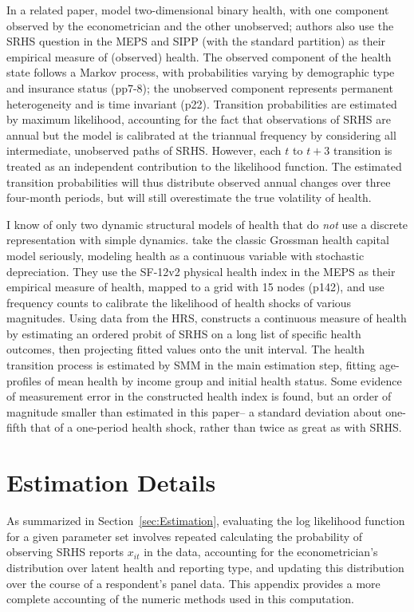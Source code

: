 \documentclass[12pt,pdftex,letterpaper]{article}
\newcommand{\Report}{x}
\begin{document}
In a related paper, \cite{AizawaFang20} model two-dimensional binary health, with one component observed by the econometrician and the other unobserved; authors also use the SRHS question in the MEPS and SIPP (with the standard partition) as their empirical measure of (observed) health.  The observed component of the health state follows a Markov process, with probabilities varying by demographic type and insurance status (pp7-8); the unobserved component represents permanent heterogeneity and is time invariant (p22).  Transition probabilities are estimated by maximum likelihood, accounting for the fact that observations of SRHS are annual but the model is calibrated at the triannual frequency by considering all intermediate, unobserved paths of SRHS.  However, each $t$ to $t+3$ transition is treated as an independent contribution to the likelihood function.  The estimated transition probabilities will thus distribute observed annual changes over three four-month periods, but will still overestimate the true volatility of health.

I know of only two dynamic structural models of health that do \textit{not} use a discrete representation with simple dynamics.  \cite{JungTran16} take the classic Grossman health capital model seriously, modeling health as a continuous variable with stochastic depreciation.  They use the SF-12v2 physical health index in the MEPS as their empirical measure of health, mapped to a grid with 15 nodes (p142), and use frequency counts to calibrate the likelihood of health shocks of various magnitudes.  Using data from the HRS, \cite{White18} constructs a continuous measure of health by estimating an ordered probit of SRHS on a long list of specific health outcomes, then projecting fitted values onto the unit interval.  The health transition process is estimated by SMM in the main estimation step, fitting age-profiles of mean health by income group and initial health status.  Some evidence of measurement error in the constructed health index is found, but an order of magnitude smaller than estimated in this paper-- a standard deviation about one-fifth that of a one-period health shock, rather than twice as great as with SRHS.


\section{Estimation Details}\label{app:Estimation}

As summarized in Section~\ref{sec:Estimation}, evaluating the log likelihood function for a given parameter set involves repeated calculating the probability of observing SRHS reports $\Report_{it}$ in the data, accounting for the econometrician's distribution over latent health and reporting type, and updating this distribution over the course of a respondent's panel data. This appendix provides a more complete accounting of the numeric methods used in this computation.
\end{document}
